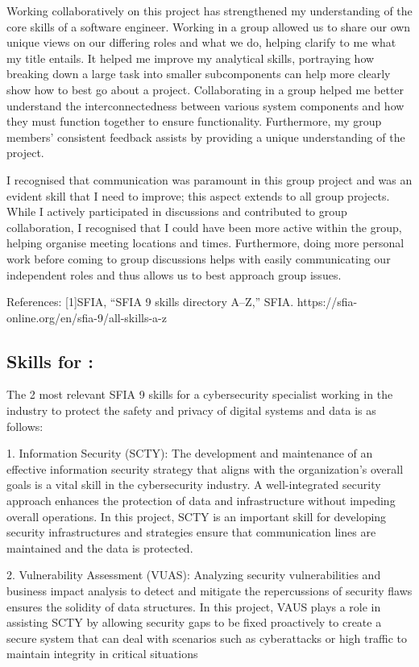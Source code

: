\documentclass[a4paper, 11pt]{report}
\begin{document}
Working collaboratively on this project has strengthened my understanding of the core skills of a software engineer. Working in a group allowed us to share our own unique views on our differing roles and what we do, helping clarify to me what my title entails. It helped me improve my analytical skills, portraying how breaking down a large task into smaller subcomponents can help more clearly show how to best go about a project. Collaborating in a group helped me better understand the interconnectedness between various system components and how they must function together to ensure functionality. Furthermore, my group members' consistent feedback assists by providing a unique understanding of the project.

I recognised that communication was paramount in this group project and was an evident skill that I need to improve; this aspect extends to all group projects. While I actively participated in discussions and contributed to group collaboration, I recognised that I could have been more active within the group, helping organise meeting locations and times. Furthermore, doing more personal work before coming to group discussions helps with easily communicating our independent roles and thus allows us to best approach group issues.



References:
[1]SFIA, “SFIA 9 skills directory A–Z,” SFIA. https://sfia-online.org/en/sfia-9/all-skills-a-z

\subsection{Skills for \majD: \studD}

The 2 most relevant SFIA 9 skills for a cybersecurity specialist working in the industry to protect the safety and privacy of digital systems and data is as follows:

1. Information Security (SCTY): The development and maintenance of an effective information security strategy that aligns with the organization's overall goals is a vital skill in the cybersecurity industry. A well-integrated security approach enhances the protection of data and infrastructure without impeding overall operations. In this project, SCTY is an important skill for developing security infrastructures and strategies ensure that communication lines are maintained and the data is protected.

2. Vulnerability Assessment (VUAS): Analyzing security vulnerabilities and business impact analysis to detect and mitigate the repercussions of security flaws ensures the solidity of data structures. In this project, VAUS plays a role in assisting SCTY by allowing security gaps to be fixed proactively to create a secure system that can deal with scenarios such as cyberattacks or high traffic to maintain integrity in critical situations
\end{document}

